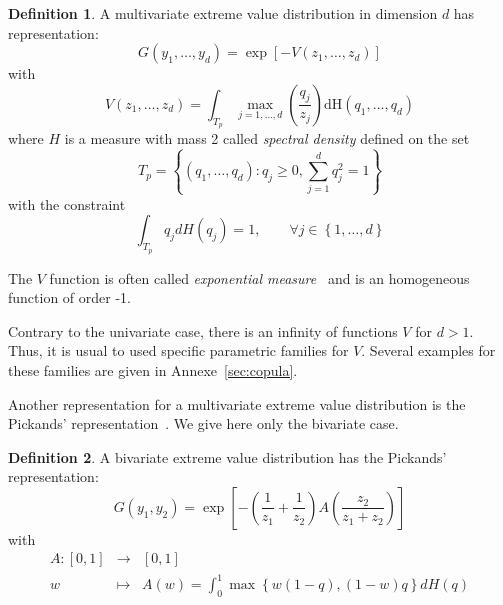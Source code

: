 \documentclass[a4paper]{article}
\numberwithin{equation}{section}
\theoremstyle{definition}
\newtheorem{defi}{Definition}[subsection]
\begin{document}
\begin{defi}
  A multivariate extreme value distribution in dimension $d$ has
  representation:
  \begin{equation}
    \label{eq:expMesRep}
    G\left(y_1, \ldots, y_d \right) = \exp\left[-V\left(z_1, \ldots,
        z_d \right) \right]
  \end{equation}
  with
  \begin{displaymath}
    V(z_1, \ldots, z_d) = \int_{T_p} \max_{j=1,\ldots,d}
    \left(\frac{q_j}{z_j} \right) \mbox{dH}\left(q_1,
      \ldots,q_d\right) 
  \end{displaymath}
  where $H$ is a measure with mass 2 called \emph{spectral density}
  defined on the set
  \begin{displaymath}
    T_p = \left\{ \left(q_1, \ldots, q_d \right) : q_j \geq 0,
    \sum_{j=1}^d q_j^2 = 1 \right\}
  \end{displaymath}
  with the constraint
  \begin{displaymath}
    \int_{T_p} q_jdH(q_j) = 1, \qquad \forall j \in \left\{1, \ldots,
      d\right\}
  \end{displaymath}
\end{defi}

The $V$ function is often called \emph{exponential
  measure}~\citep{Kluppelberg2006} and is an homogeneous function of
order -1.

Contrary to the univariate case, there is an infinity of functions $V$
for $d>1$. Thus, it is usual to used specific parametric families for
$V$. Several examples for these families are given in
Annexe~\ref{sec:copula}.

Another representation for a multivariate extreme value distribution
is the Pickands' representation~\citep{Pickands1981}. We give here
only the bivariate case.

\begin{defi}
  A bivariate extreme value distribution has the Pickands' representation:
  \begin{equation}
    \label{eq:pickDepRep}
    G\left(y_1, y_2 \right) = \exp\left[- \left(\frac{1}{z_1} +
        \frac{1}{z_2} \right) A\left( \frac{z_2}{z_1+z_2} \right)
    \right]
  \end{equation}
  with
  \begin{eqnarray*}
    A : \left[0, 1 \right] &\longrightarrow& \left[0, 1 \right]\\
    w &\longmapsto& A(w) = \int_0^1 \max\left\{w\left(1-q\right),
      \left(1-w \right)q \right\} dH(q)
  \end{eqnarray*}
\end{defi}
\end{document}
